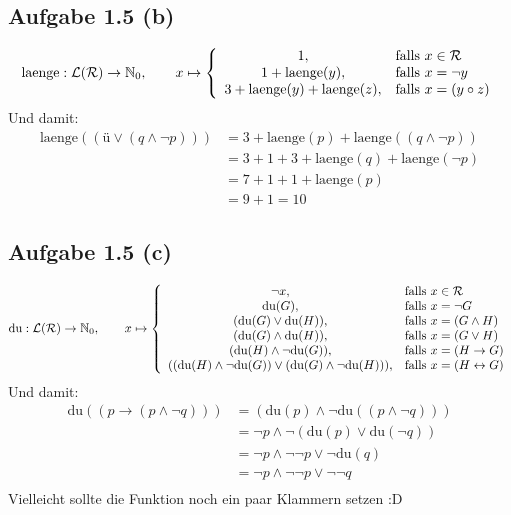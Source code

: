\documentclass[12pt,a4paper]{article}
\begin{document}
\subsection*{Aufgabe 1.5 (b)}
\begin{align*}
\text{laenge}:\mathcal{L}(\mathcal{R})\to\mathbb{N}_0,\qquad x\mapsto \left\lbrace\begin{array}{cl}
1, & \text{falls } x\in\mathcal{R}\\
1+\text{laenge}(y), & \text{falls } x=\neg y\\
3+\text{laenge}(y)+\text{laenge}(z), & \text{falls } x=(y\circ z)
\end{array}\right.
\end{align*}
Und damit:
\begin{align*}
\text{laenge}((ü\vee(q\wedge\neg p))) 
&=3+\text{laenge}(p)+\text{laenge}((q\wedge\neg p))\\
&=3+1+3+\text{laenge}(q)+\text{laenge}(\neg p)\\
&=7 + 1 + 1+ \text{laenge}(p)\\
&=9+1=10
\end{align*}

\subsection*{Aufgabe 1.5 (c)}
\begin{align*}
\text{du}:\mathcal{L}(\mathcal{R})\to\mathbb{N}_0,\qquad x\mapsto \left\lbrace\begin{array}{cl}
\neg x, & \text{falls } x\in\mathcal{R}\\
\text{du}(G), & \text{falls } x=\neg G\\
(\text{du}(G)\vee\text{du}(H)), & \text{falls } x=(G\wedge H)\\
(\text{du}(G)\wedge\text{du}(H)), & \text{falls } x=(G\vee H)\\
(\text{du}(H)\wedge\neg\text{du}(G)), & \text{falls } x=(H\to G)\\
((\text{du}(H)\wedge\neg \text{du}(G))\vee(\text{du}(G)\wedge\neg\text{du}(H))), & \text{falls } x=(H\leftrightarrow G)\\
\end{array}\right.
\end{align*}
Und damit:
\begin{align*}
\text{du}((p\to(p\wedge\neg q)))
&=(\text{du}(p)\wedge\neg\text{du}((p\wedge\neg q)))\\
&=\neg p\wedge\neg(\text{du}(p)\vee\text{du}(\neg q))\\
&=\neg p\wedge\neg\neg p\vee\neg\text{du}(q)\\
&=\neg p\wedge\neg\neg p\vee\neg\neg q\\
\end{align*}
Vielleicht sollte die Funktion noch ein paar Klammern setzen :D
\end{document}
